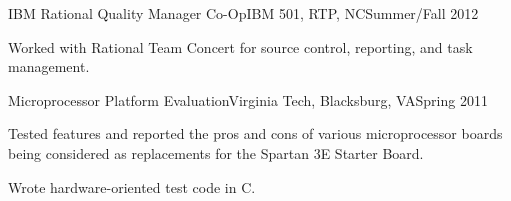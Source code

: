 \documentclass[10pt,a4paper]{article}
\begin{document}
{\begin{resumeinfo}{IBM Rational Quality Manager Co-Op}{IBM 501, RTP, NC}{Summer/Fall 2012}
         \item Worked with Rational Team Concert for source control, reporting, and task management.
     \end{resumeinfo}
     \addvspace{1em}
     \begin{resumeinfo}{Microprocessor Platform Evaluation}{Virginia Tech, Blacksburg, VA}{Spring 2011}
         \item Tested features and reported the pros and cons of various microprocessor boards
               being considered as replacements for the Spartan 3E Starter Board.
         \item Wrote hardware-oriented test code in C.
     \end{resumeinfo}
    }
    
\addvspace{1em}
\end{document}

